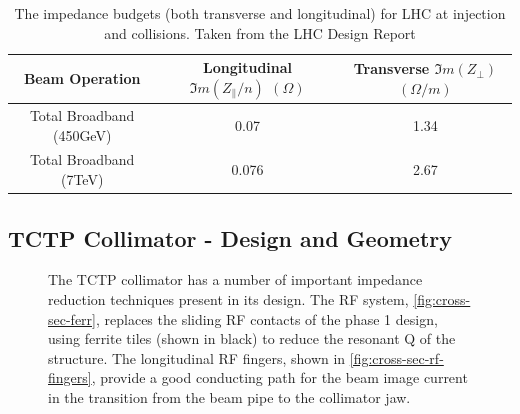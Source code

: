 \begin{table}
\caption{The impedance budgets (both transverse and longitudinal) for LHC at injection and collisions. Taken from the LHC Design Report \cite{Ruggiero:LHCColEff}}
\begin{center}
\begin{tabular}{c | c | c}
Beam Operation & Longitudinal $\Im{}m ( Z_{\parallel}/n )$ $( \Omega )$ & Transverse $\Im{}m ( Z_{\perp} )$ $( \Omega /m )$\\ \hline
Total Broadband (450GeV) & 0.07 & 1.34 \\ \hline
Total Broadband (7TeV) & 0.076 & 2.67 \\ \hline
\end{tabular}
\end{center}
\label{tab:lhc-impedance-budget}
\end{table}

\subsection{TCTP Collimator - Design and Geometry}

\begin{figure}
\label{fig:tctp-figure}
\caption{The TCTP collimator has a number of important impedance reduction techniques present in its design. The RF system, \ref{fig:cross-sec-ferr}, replaces the sliding RF contacts of the phase 1 design, using ferrite tiles (shown in black) to reduce the resonant Q of the structure. The longitudinal RF fingers, shown in \ref{fig:cross-sec-rf-fingers}, provide a good conducting path for the beam image current in the transition from the beam pipe to the collimator jaw.}
\end{figure}


